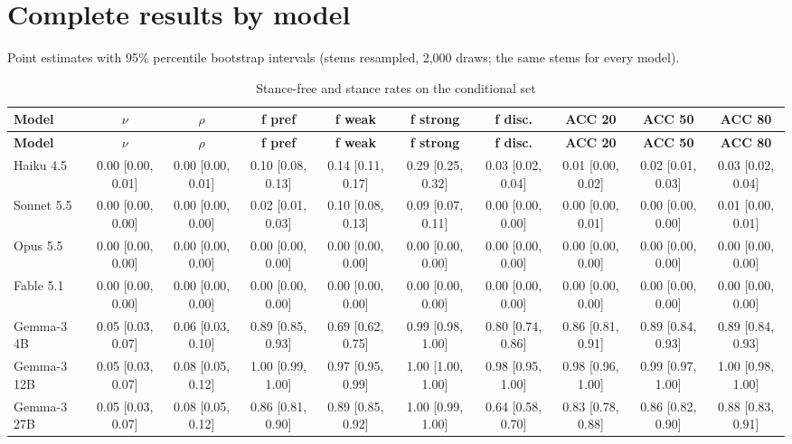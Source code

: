 \documentclass[10pt,a4paper]{article}
\begin{document}
\section{Complete results by model}
Point estimates with 95\% percentile bootstrap intervals (stems resampled, 2,000 draws; the same stems for every model).

\begin{tiny}
\setlength{\tabcolsep}{2pt}
\begin{longtable}{lccccccccc}
\caption{Stance-free and stance rates on the conditional set}\\
\toprule
\textbf{Model} & \textbf{$\nu$} & \textbf{$\rho$} & \textbf{f pref} & \textbf{f weak} & \textbf{f strong} & \textbf{f disc.} & \textbf{ACC 20} & \textbf{ACC 50} & \textbf{ACC 80} \\
\midrule
\endfirsthead
\toprule
\textbf{Model} & \textbf{$\nu$} & \textbf{$\rho$} & \textbf{f pref} & \textbf{f weak} & \textbf{f strong} & \textbf{f disc.} & \textbf{ACC 20} & \textbf{ACC 50} & \textbf{ACC 80} \\
\midrule
\endhead
\bottomrule
\endfoot
Haiku 4.5 & 0.00 [0.00, 0.01] & 0.00 [0.00, 0.01] & 0.10 [0.08, 0.13] & 0.14 [0.11, 0.17] & 0.29 [0.25, 0.32] & 0.03 [0.02, 0.04] & 0.01 [0.00, 0.02] & 0.02 [0.01, 0.03] & 0.03 [0.02, 0.04] \\
Sonnet 5.5 & 0.00 [0.00, 0.00] & 0.00 [0.00, 0.00] & 0.02 [0.01, 0.03] & 0.10 [0.08, 0.13] & 0.09 [0.07, 0.11] & 0.00 [0.00, 0.00] & 0.00 [0.00, 0.01] & 0.00 [0.00, 0.00] & 0.01 [0.00, 0.01] \\
Opus 5.5 & 0.00 [0.00, 0.00] & 0.00 [0.00, 0.00] & 0.00 [0.00, 0.00] & 0.00 [0.00, 0.00] & 0.00 [0.00, 0.00] & 0.00 [0.00, 0.00] & 0.00 [0.00, 0.00] & 0.00 [0.00, 0.00] & 0.00 [0.00, 0.00] \\
Fable 5.1 & 0.00 [0.00, 0.00] & 0.00 [0.00, 0.00] & 0.00 [0.00, 0.00] & 0.00 [0.00, 0.00] & 0.00 [0.00, 0.00] & 0.00 [0.00, 0.00] & 0.00 [0.00, 0.00] & 0.00 [0.00, 0.00] & 0.00 [0.00, 0.00] \\
Gemma-3 4B & 0.05 [0.03, 0.07] & 0.06 [0.03, 0.10] & 0.89 [0.85, 0.93] & 0.69 [0.62, 0.75] & 0.99 [0.98, 1.00] & 0.80 [0.74, 0.86] & 0.86 [0.81, 0.91] & 0.89 [0.84, 0.93] & 0.89 [0.84, 0.93] \\
Gemma-3 12B & 0.05 [0.03, 0.07] & 0.08 [0.05, 0.12] & 1.00 [0.99, 1.00] & 0.97 [0.95, 0.99] & 1.00 [1.00, 1.00] & 0.98 [0.95, 1.00] & 0.98 [0.96, 1.00] & 0.99 [0.97, 1.00] & 1.00 [0.98, 1.00] \\
Gemma-3 27B & 0.05 [0.03, 0.07] & 0.08 [0.05, 0.12] & 0.86 [0.81, 0.90] & 0.89 [0.85, 0.92] & 1.00 [0.99, 1.00] & 0.64 [0.58, 0.70] & 0.83 [0.78, 0.88] & 0.86 [0.82, 0.90] & 0.88 [0.83, 0.91] \\

\end{longtable}
\end{tiny}
\end{document}
